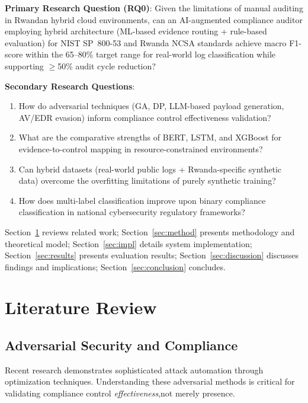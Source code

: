 \documentclass[futureinternet,article,submit,pdftex,moreauthors]{Definitions/mdpi}
\begin{document}
\textbf{Primary Research Question (RQ0)}: Given the limitations of manual auditing in Rwandan
hybrid cloud environments, can an AI-augmented compliance auditor employing hybrid architecture
(ML-based evidence routing + rule-based evaluation) for NIST SP~800-53 and Rwanda NCSA
standards achieve macro F1-score within the 65--80\% target range for real-world log
classification while supporting $\geq$50\% audit cycle reduction?

\textbf{Secondary Research Questions}:
\begin{enumerate}
\item[\textbf{RQ1}] How do adversarial techniques (GA, DP, LLM-based payload generation,
AV/EDR evasion) inform compliance control effectiveness validation?
\item[\textbf{RQ2}] What are the comparative strengths of BERT, LSTM, and XGBoost for
evidence-to-control mapping in resource-constrained environments?
\item[\textbf{RQ3}] Can hybrid datasets (real-world public logs + Rwanda-specific synthetic
data) overcome the overfitting limitations of purely synthetic training?
\item[\textbf{RQ4}] How does multi-label classification improve upon binary compliance
classification in national cybersecurity regulatory frameworks?
\end{enumerate}

Section~\ref{sec:lit} reviews related work; Section~\ref{sec:method} presents methodology
and theoretical model; Section~\ref{sec:impl} details system implementation;
Section~\ref{sec:results} presents evaluation results; Section~\ref{sec:discussion} discusses
findings and implications; Section~\ref{sec:conclusion} concludes.

\section{Literature Review}
\label{sec:lit}

\subsection{Adversarial Security and Compliance}

Recent research demonstrates sophisticated attack automation through optimization techniques.
Understanding these adversarial methods is critical for validating compliance control
\textit{effectiveness},not merely presence.
\end{document}
